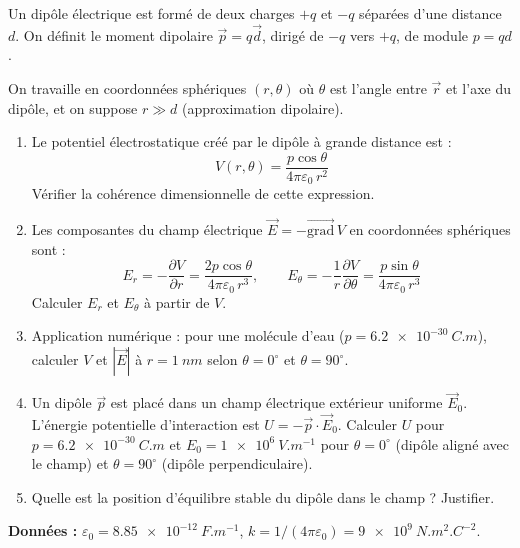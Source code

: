 \documentclass[12pt,a4paper]{article}
\begin{document}
\begin{boiteexercice}
Un dipôle électrique est formé de deux charges $+q$ et $-q$ séparées d'une distance $d$. On définit le moment dipolaire $\vec{p} = q\vec{d}$, dirigé de $-q$ vers $+q$, de module $p = qd$.

On travaille en coordonnées sphériques $(r, \theta)$ où $\theta$ est l'angle entre $\vec{r}$ et l'axe du dipôle, et on suppose $r \gg d$ (approximation dipolaire).

\begin{enumerate}
  \item Le potentiel électrostatique créé par le dipôle à grande distance est :
  \[
  V(r,\theta) = \frac{p\cos\theta}{4\pi\varepsilon_0\,r^2}
  \]
  Vérifier la cohérence dimensionnelle de cette expression.

  \item Les composantes du champ électrique $\vec{E} = -\overrightarrow{\text{grad}}\,V$ en coordonnées sphériques sont :
  \[
  E_r = -\frac{\partial V}{\partial r} = \frac{2p\cos\theta}{4\pi\varepsilon_0\,r^3}, \qquad
  E_\theta = -\frac{1}{r}\frac{\partial V}{\partial\theta} = \frac{p\sin\theta}{4\pi\varepsilon_0\,r^3}
  \]
  Calculer $E_r$ et $E_\theta$ à partir de $V$.

  \item Application numérique : pour une molécule d'eau ($p = \qty{6.2e-30}{C.m}$), calculer $V$ et $|\vec{E}|$ à $r = \qty{1}{nm}$ selon $\theta = 0^\circ $ et $\theta = 90^\circ $.

  \item Un dipôle $\vec{p}$ est placé dans un champ électrique extérieur uniforme $\vec{E}_0$. L'énergie potentielle d'interaction est $U = -\vec{p}\cdot\vec{E}_0$. Calculer $U$ pour $p = \qty{6.2e-30}{C.m}$ et $E_0 = \qty{1e6}{V.m^{-1}}$ pour $\theta = 0^\circ $ (dipôle aligné avec le champ) et $\theta = 90^\circ $ (dipôle perpendiculaire).

  \item Quelle est la position d'équilibre stable du dipôle dans le champ ? Justifier.
\end{enumerate}

\textbf{Données :} $\varepsilon_0 = \qty{8.85e-12}{F.m^{-1}}$, $k = 1/(4\pi\varepsilon_0) = \qty{9e9}{N.m^2.C^{-2}}$.
\end{boiteexercice}
\end{document}
